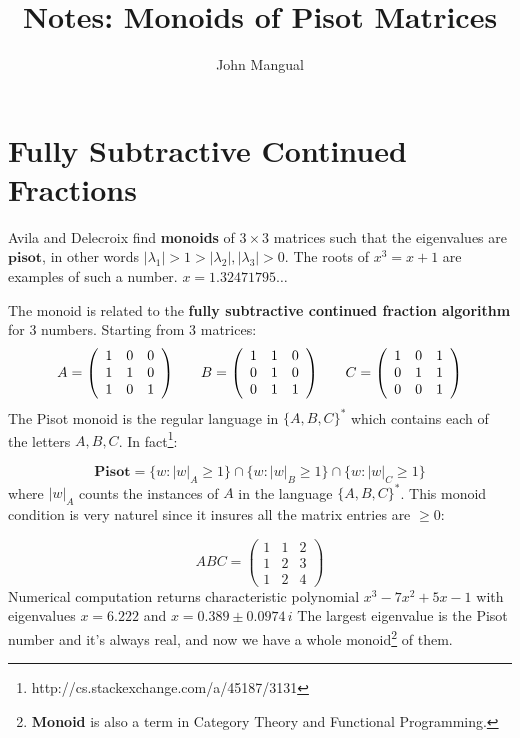 \documentclass[12pt]{article}
\title{Notes: Monoids of Pisot Matrices}
\author{John Mangual}
\date{}
\begin{document}
{\selectfont

\maketitle

\section{Fully Subtractive Continued Fractions}

Avila and Delecroix find \textbf{monoids} of $3\times 3$ matrices such that the eigenvalues are $\textbf{pisot}$, in other words $|\lambda_1| > 1 > |\lambda_2|, |\lambda_3| > 0$.  The roots of $x^3 = x + 1$ are examples of such a number.  $x = 1.32471795\dots$

The monoid is related to the \textbf{fully subtractive continued fraction algorithm} for 3 numbers.  Starting from 3 matrices:
$$ 
A = \left(\begin{array}{ccc} 1 & 0 & 0 \\ 1 & 1 & 0 \\ 1 & 0 & 1\end{array}\right)\hspace{0.25in}
B = \left(\begin{array}{ccc} 1 & 1 & 0 \\ 0 & 1 & 0 \\ 0 & 1 & 1\end{array}\right)\hspace{0.25in}
C = \left(\begin{array}{ccc} 1 & 0 & 1 \\ 0 & 1 & 1 \\ 0 & 0 & 1\end{array}\right) 
$$
The Pisot monoid is the regular language in $\{A,B,C\}^*$ which contains each of the letters $A,B,C$. In fact\footnote{http://cs.stackexchange.com/a/45187/3131}:

$$\textbf{Pisot} = \{ w: |w|_A \geq 1 \}  \cap \{ w: |w|_B \geq 1 \}\cap\{ w: |w|_C \geq 1 \}$$
where $|w|_A$ counts the instances of $A$ in the language $\{A,B,C\}^*$.  This monoid condition is very naturel since it insures all the matrix entries are $\geq 0$:

$$ ABC = 
 \left(\begin{array}{ccc} 1 & 1 & 2 \\ 1 & 2 & 3 \\ 1 & 2 & 4\end{array}\right) 
 $$
Numerical computation returns characteristic polynomial $x^3 -7x^2+5x-1 $ with eigenvalues $x = \boxed{6.222}$ and $x= \boxed{0.389 \pm 0.0974\,i} $  The largest eigenvalue is the Pisot number and it's always real, and now we have a whole monoid\footnote{\textbf{Monoid} is also a term in Category Theory and Functional Programming.} of them.

}
\end{document}
